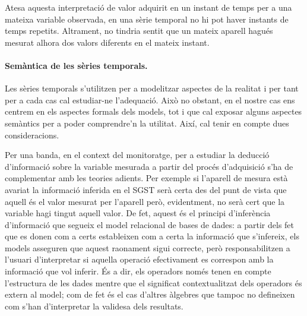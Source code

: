 Atesa aquesta interpretació de valor adquirit en un instant de
temps per a una mateixa variable observada, en una sèrie temporal no
hi pot haver instants de temps repetits. Altrament, no tindria sentit
que un mateix aparell hagués mesurat alhora dos valors diferents en el
mateix instant.
  






\paragraph{Semàntica de les sèries temporals.}
Les sèries temporals s'utilitzen per a modelitzar aspectes de la
realitat i per tant per a cada cas cal estudiar-ne l'adequació.  Això
no obstant, en el nostre cas ens centrem en els aspectes formals dels
models, tot i que cal exposar alguns aspectes semàntics per a poder
comprendre'n la utilitat. Així, cal tenir en compte dues
consideracions.


Per una banda, en el context del monitoratge, per a estudiar la
deducció d'informació sobre la variable mesurada a partir del procés
d'adquisició s'ha de complementar amb les teories adients.  Per
exemple si l'aparell de mesura està avariat la informació inferida en
el \gls{SGST} serà certa des del punt de vista que aquell és el valor
mesurat per l'aparell però, evidentment, no serà cert que la variable
hagi tingut aquell valor. De fet, aquest és el principi d'inferència
d'informació que segueix el model relacional de bases de dades: a
partir dels fet que es donen com a certs estableixen com a certa la
informació que s'infereix, els models asseguren que aquest raonament
sigui correcte, però responsabilitzen a l'usuari d'interpretar si
aquella operació efectivament es correspon amb la informació que vol
inferir. És a dir, els operadors només tenen en compte l'estructura de
les dades mentre que el significat contextualitzat dels operadors és
extern al model; com de fet és el cas d'altres àlgebres que tampoc no
defineixen com s'han d'interpretar la validesa dels resultats.

